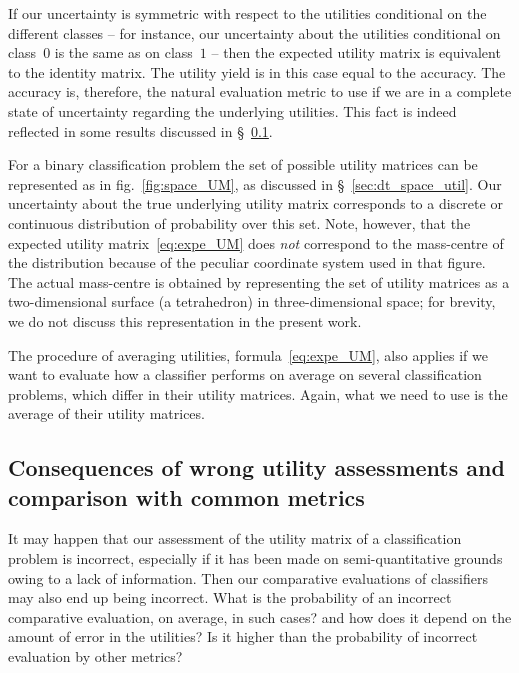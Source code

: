 \documentclass[\ifafour a4paper,12pt,\else a5paper,10pt,\fi%
onecolumn,oneside,article,%
british%
]{memoir}
\theoremstyle{remark}
\theoremstyle{innote}
\renewcommand*{\|}[1][]{\nonscript\:#1\vert\nonscript\:\mathopen{}}
\newcommand*{\sect}{\S}%
\newcommand*{\fig}{fig.}%
\begin{document}
If our uncertainty is symmetric with respect to the utilities conditional on the different classes -- for instance, our uncertainty about the utilities conditional on class~$0$ is the same as on class~$1$ -- then the expected utility matrix is equivalent to the identity matrix. The utility yield is in this case equal to the accuracy. The accuracy is, therefore, the natural evaluation metric to use if we are in a complete state of uncertainty regarding the underlying utilities. This fact is indeed reflected in some results discussed in \sect~\ref{sec:wrong_utility_assess}.


For a binary classification problem the set of possible utility matrices can be represented as in \fig~\ref{fig:space_UM}, as discussed in \sect~\ref{sec:dt_space_util}. Our uncertainty about the true underlying utility matrix corresponds to a discrete or continuous distribution of probability over this set. Note, however, that the expected utility matrix~\eqref{eq:expe_UM} does \emph{not} correspond to the mass-centre of the distribution because of the peculiar coordinate system used in that figure. The actual mass-centre is obtained by representing the set of utility matrices as a two-dimensional surface (a tetrahedron) in three-dimensional space; for brevity, we do not discuss this representation in the present work.

\medskip

The procedure of averaging utilities, formula~\eqref{eq:expe_UM}, also applies if we want to evaluate how a classifier performs on average on several classification problems, which differ in their utility matrices. Again, what we need to use is the average of their utility matrices.



\subsection{Consequences of wrong utility assessments and comparison with common metrics}
\label{sec:wrong_utility_assess}

It may happen that our assessment of the utility matrix of a classification problem is incorrect, especially if it has been made on semi-quantitative grounds owing to a lack of information. Then our comparative evaluations of classifiers may also end up being incorrect. What is the probability of an incorrect comparative evaluation, on average, in such cases? and how does it depend on the amount of error in the utilities? Is it higher than the probability of incorrect evaluation by other metrics?
\end{document}
